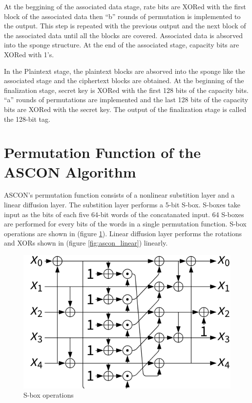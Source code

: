 At the beggining of the associated data stage, rate bits are XORed with the first block of the associated data then “b” rounds of permutation is implemented to the output. This step is repeated with the previous output and the next block of the associated data until all the blocks are covered. Associated data is absorved into the sponge structure. At the end of the associated stage, capacity bits are XORed with 1’s.

In the Plaintext stage, the plaintext blocks are absorved into the sponge like the associated stage and the ciphertext blocks are obtained. At the beginning of the finalization stage, secret key is XORed with the first 128 bits of the capacity bits. “a” rounds of permutations are implemented and the last 128 bits of the capacity bits are XORed with the secret key. The output of the finalization stage is called the 128-bit tag. 

\section{Permutation Function of the ASCON Algorithm}


ASCON’s permutation function consists of a nonlinear substition layer and a linear diffusion layer. The substition layer performs a 5-bit S-box. S-boxes take input as the bits of each five 64-bit words of the concatanated input. 64 S-boxes are performed for every bits of the words in a single permutation function. S-box operations are shown in (figure \ref{fig:sbox_operations}). Linear diffusion layer performs the rotations and XORs shown in (figure \ref{fig:ascon_linear}) linearly.

\begin{figure}
    \centering
    \includegraphics[scale = 0.8]{ascon_sbox/s_box_ascon.png}
    \caption{S-box operations}
    \label{fig:sbox_operations}
\end{figure}


